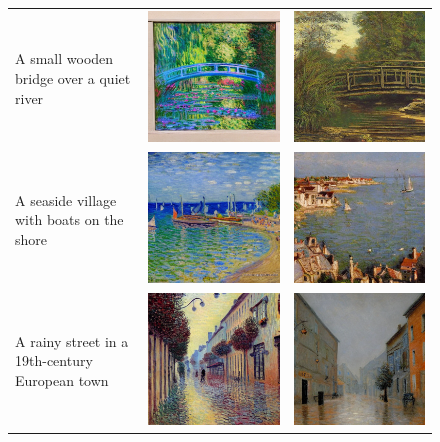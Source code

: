 \begin{figure}[htb]
\begin{tabular}{p{4.5cm}c@{\hskip 0.5cm}c}
A small wooden bridge over a quiet river &
\includegraphics[width=0.25\linewidth]{modelo_base/03_a_small_wooden_bridge_over_a_q.png} &
\includegraphics[width=0.25\linewidth]{modelo_lora/03_a_small_wooden_bridge_over_a_q.png} \\

A seaside village with boats on the shore &
\includegraphics[width=0.25\linewidth]{modelo_base/04_a_seaside_village_with_boats_o.png} &
\includegraphics[width=0.25\linewidth]{modelo_lora/04_a_seaside_village_with_boats_o.png} \\

A rainy street in a 19th-century European town &
\includegraphics[width=0.25\linewidth]{modelo_base/05_a_rainy_street_in_a_19th-centu.png} &
\includegraphics[width=0.25\linewidth]{modelo_lora/05_a_rainy_street_in_a_19th-centu.png} \\

\bottomrule
\end{tabular}
\end{figure}


